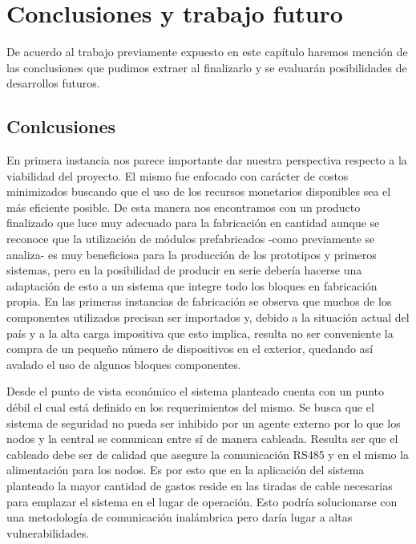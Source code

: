 \chapter{Conclusiones y trabajo futuro} \par

De acuerdo al trabajo previamente expuesto en este capítulo haremos mención de las conclusiones que pudimos extraer al 
finalizarlo y se evaluarán posibilidades de desarrollos futuros. \par

\section{Conlcusiones} \par 

En primera instancia nos parece importante dar nuestra perspectiva respecto a la viabilidad del proyecto. El mismo fue
enfocado con carácter de costos minimizados buscando que el uso de los recursos monetarios disponibles sea el más eficiente
posible. De esta manera nos encontramos con un producto finalizado que luce muy adecuado para la fabricación en cantidad aunque 
se reconoce que la utilización de módulos prefabricados -como previamente se analiza- es muy beneficiosa para la producción
de los prototipos y primeros sistemas, pero en la posibilidad de producir en serie debería hacerse una adaptación de esto a
un sistema que integre todo los bloques en fabricación propia. En las primeras instancias de fabricación se observa que
muchos de los componentes utilizados precisan ser importados y, debido a la situación actual del país y a la alta carga impositiva
que esto implica, resulta no ser conveniente la compra de un pequeño número de dispositivos en el exterior, quedando así 
avalado el uso de algunos bloques componentes. \par 
Desde el punto de vista económico el sistema planteado cuenta con un punto débil el cual está definido en los requerimientos del
mismo. Se busca que el sistema de seguridad no pueda ser inhibido por un agente externo por lo que los nodos y 
la central se comunican entre sí de manera cableada. Resulta ser que el cableado debe ser de calidad que asegure la comunicación
RS485 y en el mismo la alimentación para los nodos. Es por esto que en la aplicación del sistema planteado la mayor 
cantidad de gastos reside en las tiradas de cable necesarias para emplazar el sistema en el lugar de operación. Esto podría
solucionarse con una metodología de comunicación inalámbrica pero daría lugar a altas vulnerabilidades. \par
